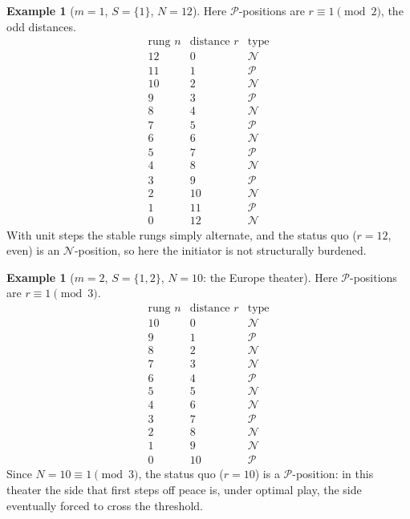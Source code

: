\documentclass[11pt]{article}
\theoremstyle{plain}
\theoremstyle{definition}
\newtheorem{example}[theorem]{Example}
\theoremstyle{remark}
\begin{document}
\begin{example}[$m=1$, $S=\{1\}$, $N=12$]\label{ex:m1}
Here $\mathcal{P}$-positions are $r\equiv 1\pmod 2$, the odd distances.
\[
\begin{array}{c|c|c}
\text{rung } n & \text{distance } r & \text{type}\\\hline
12 & 0 & \mathcal{N}\\
11 & 1 & \mathcal{P}\\
10 & 2 & \mathcal{N}\\
9 & 3 & \mathcal{P}\\
8 & 4 & \mathcal{N}\\
7 & 5 & \mathcal{P}\\
6 & 6 & \mathcal{N}\\
5 & 7 & \mathcal{P}\\
4 & 8 & \mathcal{N}\\
3 & 9 & \mathcal{P}\\
2 & 10 & \mathcal{N}\\
1 & 11 & \mathcal{P}\\
0 & 12 & \mathcal{N}
\end{array}
\]
With unit steps the stable rungs simply alternate, and the status quo
($r=12$, even) is an $\mathcal{N}$-position, so here the initiator is not
structurally burdened.
\end{example}

\begin{example}[$m=2$, $S=\{1,2\}$, $N=10$: the Europe theater]\label{ex:m2}
Here $\mathcal{P}$-positions are $r\equiv 1\pmod 3$.
\[
\begin{array}{c|c|c}
\text{rung } n & \text{distance } r & \text{type}\\\hline
10 & 0 & \mathcal{N}\\
9 & 1 & \mathcal{P}\\
8 & 2 & \mathcal{N}\\
7 & 3 & \mathcal{N}\\
6 & 4 & \mathcal{P}\\
5 & 5 & \mathcal{N}\\
4 & 6 & \mathcal{N}\\
3 & 7 & \mathcal{P}\\
2 & 8 & \mathcal{N}\\
1 & 9 & \mathcal{N}\\
0 & 10 & \mathcal{P}
\end{array}
\]
Since $N=10\equiv 1\pmod 3$, the status quo ($r=10$) is a
$\mathcal{P}$-position: in this theater the side that first steps off peace
is, under optimal play, the side eventually forced to cross the threshold.
\end{example}
\end{document}
